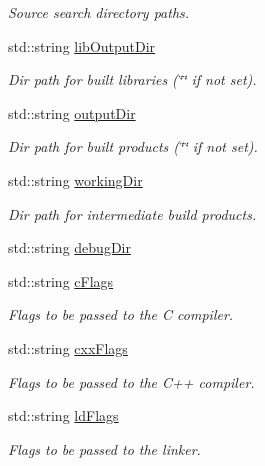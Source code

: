 \begin{DoxyCompactItemize}
\begin{DoxyCompactList}\small\item\em Source search directory paths. \end{DoxyCompactList}\item 
std\+::string \hyperlink{structmk_1_1_build_params__t_a539fd8767623678f93944364d0a0ebb8}{lib\+Output\+Dir}
\begin{DoxyCompactList}\small\item\em Dir path for built libraries (\char`\"{}\char`\"{} if not set). \end{DoxyCompactList}\item 
std\+::string \hyperlink{structmk_1_1_build_params__t_a06f93fa0c7f84473bc7b3c09867cc098}{output\+Dir}
\begin{DoxyCompactList}\small\item\em Dir path for built products (\char`\"{}\char`\"{} if not set). \end{DoxyCompactList}\item 
std\+::string \hyperlink{structmk_1_1_build_params__t_a8077185bba84311c65d09b5198d3a9cb}{working\+Dir}
\begin{DoxyCompactList}\small\item\em Dir path for intermediate build products. \end{DoxyCompactList}\item 
std\+::string \hyperlink{structmk_1_1_build_params__t_a31f61e0b4f096c8f1054cef051b4c7ef}{debug\+Dir}
\item 
std\+::string \hyperlink{structmk_1_1_build_params__t_a0dd5594abb94c402aced93580c0ed837}{c\+Flags}
\begin{DoxyCompactList}\small\item\em Flags to be passed to the C compiler. \end{DoxyCompactList}\item 
std\+::string \hyperlink{structmk_1_1_build_params__t_a8dac640bfde50a3cc4b676f440b7c535}{cxx\+Flags}
\begin{DoxyCompactList}\small\item\em Flags to be passed to the C++ compiler. \end{DoxyCompactList}\item 
std\+::string \hyperlink{structmk_1_1_build_params__t_a13ef4d956196d04026f380b506016e3b}{ld\+Flags}
\begin{DoxyCompactList}\small\item\em Flags to be passed to the linker. \end{DoxyCompactList}\item 

\end{DoxyCompactItemize}
